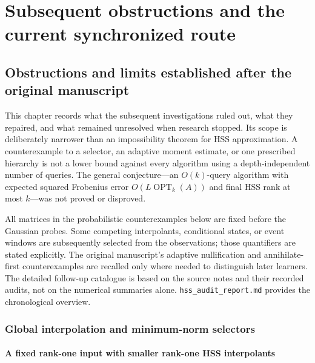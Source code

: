 \documentclass[11pt,oneside,openany,a4paper]{book}
\numberwithin{equation}{chapter}
\theoremstyle{definition}
\theoremstyle{remark}
\newcommand{\sourcefile}[1]{{\small\nolinkurl{#1}}}
\begin{document}
\endgroup


\part{Subsequent obstructions and the current synchronized route}
\label{upd:part:current}
\chapter{Obstructions and limits established after the original manuscript}
\label{upd:chap:later-obstructions}

This chapter records what the subsequent investigations ruled out, what
they repaired, and what remained unresolved when research stopped.  Its
scope is deliberately narrower than an impossibility theorem for HSS
approximation.  A counterexample to a selector, an adaptive moment
estimate, or one prescribed hierarchy is not a lower bound against every
algorithm using a depth-independent number of queries.  The general
conjecture---an $O(k)$-query algorithm with expected squared Frobenius
error $O(L\operatorname{OPT}_k(A))$ and final HSS rank at most $k$---was
not proved or disproved.

All matrices in the probabilistic counterexamples below are fixed before
the Gaussian probes.  Some competing interpolants, conditional states,
or event windows are subsequently selected from the observations; those
quantifiers are stated explicitly.  The original manuscript's adaptive
nullification and annihilate-first counterexamples are recalled only
where needed to distinguish later learners.  The detailed follow-up
catalogue is based on the source notes and their recorded audits, not
on the numerical summaries alone.  \sourcefile{hss_audit_report.md}
provides the chronological overview.

\section{Global interpolation and minimum-norm selectors}
\label{upd:sec:later-global-selectors}

\subsection{A fixed rank-one input with smaller rank-one HSS interpolants}
\end{document}
